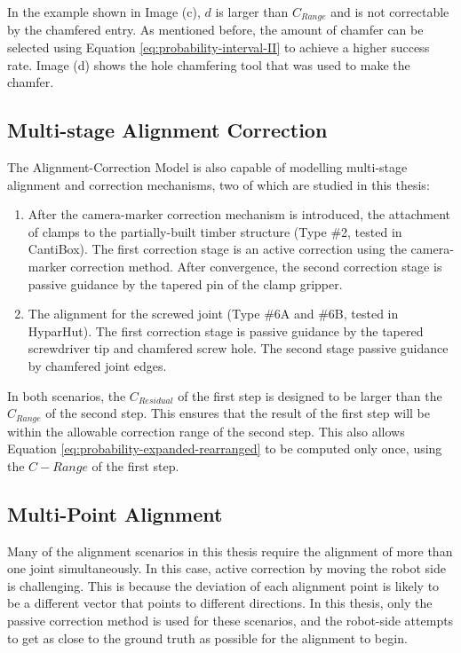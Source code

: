 In the example shown in Image (c), $d$ is larger than $C_{Range}$ and is not correctable by the chamfered entry. As mentioned before, the amount of chamfer can be selected using Equation \ref{eq:probability-interval-II} to achieve a higher success rate. Image (d) shows the hole chamfering tool that was used to make the chamfer.



\subsection{Multi-stage Alignment Correction}
\label{subsection:new-hypo-multi-stage-alignment-correction}

The Alignment-Correction Model is also capable of modelling multi-stage alignment and correction mechanisms, two of which are studied in this thesis:

\begin{enumerate}
	\item After the camera-marker correction mechanism is introduced, the attachment of clamps to the partially-built timber structure (Type \#2, tested in CantiBox). The first correction stage is an active correction using the camera-marker correction method. After convergence, the second correction stage is passive guidance by the tapered pin of the clamp gripper.

	\item The alignment for the screwed joint (Type \#6A and \#6B, tested in HyparHut). The first correction stage is passive guidance by the tapered screwdriver tip and chamfered screw hole. The second stage passive guidance by chamfered joint edges. 

\end{enumerate}
In both scenarios, the $C_{Residual}$ of the first step is designed to be larger than the $C_{Range}$ of the second step. This ensures that the result of the first step will be within the allowable correction range of the second step. This also allows Equation \ref{eq:probability-expanded-rearranged} to be computed only once, using the $C-{Range}$ of the first step.

\subsection{Multi-Point Alignment}
\label{subsection:new-hypo-multi-point-alignment}

Many of the alignment scenarios in this thesis require the alignment of more than one joint simultaneously. In this case, active correction by moving the robot side is challenging. This is because the deviation of each alignment point is likely to be a different vector that points to different directions. In this thesis, only the passive correction method is used for these scenarios, and the robot-side attempts to get as close to the ground truth as possible for the alignment to begin. 

